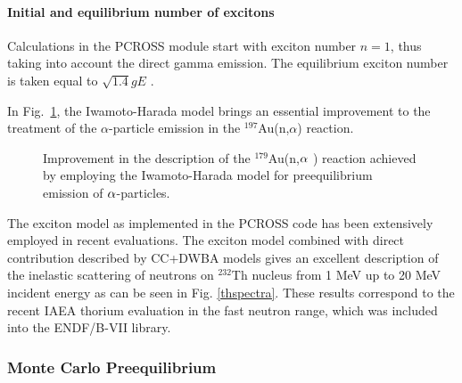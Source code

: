 \paragraph{Initial and equilibrium number of excitons}

Calculations in the PCROSS module start with exciton number $n=1$, thus
taking into account the direct gamma emission. The equilibrium exciton
number is taken equal to $\sqrt{1.4}gE$ \cite{za88,za89}.

\bigskip In Fig.~\ref{goldna}, the Iwamoto-Harada model brings an essential
improvement to the treatment of the $\alpha $-particle emission in the $%
^{197}$Au(n,$\alpha $) reaction.
\begin{figure}[tbph]
\caption{Improvement in the description of the $^{179}$Au(n,$\protect\alpha $%
) reaction achieved by employing the Iwamoto-Harada model for preequilibrium
emission of $\protect\alpha $-particles.}
\label{goldna}
\end{figure}
The exciton model as implemented in the PCROSS code has been extensively
employed in recent evaluations. The exciton model combined with direct
contribution described by CC+DWBA models gives an excellent description of
the inelastic scattering of neutrons on $^{232}$Th nucleus from 1 MeV up to
20 MeV incident energy as can be seen in Fig. \ref{thspectra}. These results
correspond to the recent IAEA thorium evaluation in the fast neutron range,
which was included into the ENDF/B-VII library.


\subsubsection{Monte Carlo Preequilibrium\label{DDHMS}}

